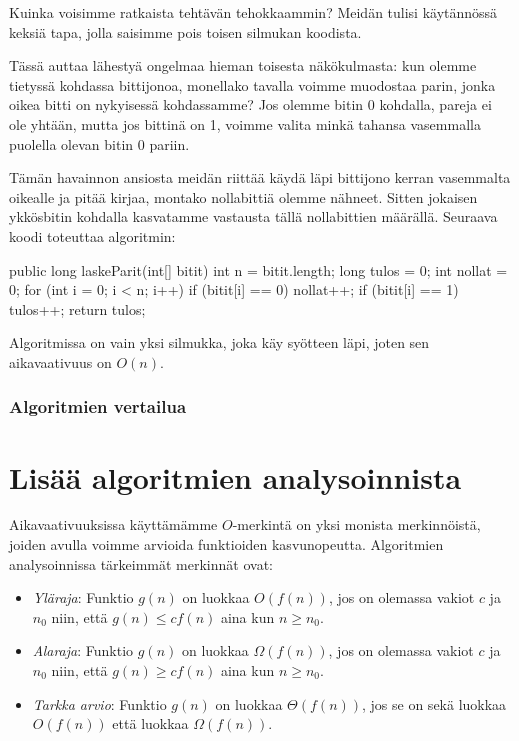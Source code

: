 Kuinka voisimme ratkaista tehtävän tehokkaammin?
Meidän tulisi käytän\-nössä keksiä tapa, jolla saisimme
pois toisen silmukan koodista.

Tässä auttaa lähestyä ongelmaa hieman toisesta
näkökulmasta: kun olemme tietyssä kohdassa bittijonoa,
monellako tavalla voimme muodostaa parin,
jonka oikea bitti on nykyisessä kohdassamme?
Jos olemme bitin 0 kohdalla, pareja ei ole yhtään,
mutta jos bittinä on 1, voimme valita minkä tahansa
vasemmalla puolella olevan bitin 0 pariin.

Tämän havainnon ansiosta meidän riittää käydä läpi
bittijono kerran vasemmalta oikealle ja pitää kirjaa,
montako nollabittiä olemme nähneet.
Sitten jokaisen ykkösbitin kohdalla kasvatamme
vastausta tällä nollabittien määrällä.
Seuraava koodi toteuttaa algoritmin:

\begin{code}
public long laskeParit(int[] bitit) {
    int n = bitit.length;
    long tulos = 0;
    int nollat = 0;
    for (int i = 0; i < n; i++) {
        if (bitit[i] == 0) nollat++;
        if (bitit[i] == 1) tulos++;
    }
    return tulos;
}
\end{code}

Algoritmissa on vain yksi silmukka, joka käy syötteen läpi,
joten sen aikavaativuus on $O(n)$.

\subsubsection{Algoritmien vertailua}

\section{Lisää algoritmien analysoinnista}

Aikavaativuuksissa käyttämämme $O$-merkintä on yksi monista merkinnöistä,
joiden avulla voimme arvioida funktioiden kasvunopeutta.
Algoritmien analysoinnissa tärkeimmät merkinnät ovat:

\begin{itemize}
\item \emph{Yläraja}: Funktio $g(n)$ on luokkaa $O(f(n))$, jos on olemassa vakiot $c$ ja $n_0$
niin, että $g(n) \le c f(n)$ aina kun $n \ge n_0$.
\item \emph{Alaraja}: Funktio $g(n)$ on luokkaa $\Omega(f(n))$, jos on olemassa vakiot $c$ ja $n_0$
niin, että $g(n) \ge c f(n)$ aina kun $n \ge n_0$.
\item \emph{Tarkka arvio}: Funktio $g(n)$ on luokkaa $\Theta(f(n))$, jos se on sekä luokkaa $O(f(n))$
että luokkaa $\Omega(f(n))$.
\end{itemize}

